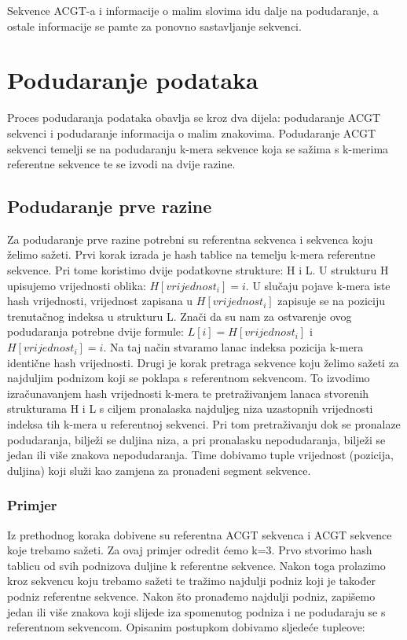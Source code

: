 Sekvence ACGT-a i informacije o malim slovima idu dalje na podudaranje, a ostale informacije se pamte za ponovno sastavljanje sekvenci.



 
\section{Podudaranje podataka}
Proces podudaranja podataka obavlja se kroz dva dijela: podudaranje ACGT sekvenci i podudaranje informacija o malim znakovima. Podudaranje ACGT sekvenci temelji se na podudaranju k-mera sekvence koja se sažima s k-merima referentne sekvence te se izvodi na dvije razine.

\subsection{Podudaranje prve razine}
Za podudaranje prve razine potrebni su referentna sekvenca i sekvenca koju želimo sažeti. 
Prvi korak izrada je hash tablice na temelju k-mera referentne sekvence. Pri tome koristimo dvije podatkovne strukture: H i L. U strukturu H upisujemo vrijednosti oblika: $H[vrijednost_{i}] = i$. U slučaju pojave k-mera iste hash vrijednosti, vrijednost zapisana u $H[vrijednost_{i}]$ zapisuje se na poziciju trenutačnog indeksa u strukturu L. Znači da su nam za ostvarenje ovog podudaranja potrebne dvije formule: $L[i] = H[vrijednost_{i}]$ i $H[vrijednost_{i}] = i$. Na taj način stvaramo lanac indeksa pozicija k-mera identične hash vrijednosti.
Drugi je korak pretraga sekvence koju želimo sažeti za najduljim podnizom koji se poklapa s referentnom sekvencom. To izvodimo izračunavanjem hash vrijednosti k-mera te pretraživanjem lanaca stvorenih strukturama H i L s ciljem pronalaska najduljeg niza uzastopnih vrijednosti indeksa tih k-mera u referentnoj sekvenci. Pri tom pretraživanju dok se pronalaze podudaranja, bilježi se duljina niza, a pri pronalasku nepodudaranja, bilježi se jedan ili više znakova nepodudaranja. Time dobivamo tuple vrijednost (pozicija, duljina) koji služi kao zamjena za pronađeni segment sekvence. 

\subsubsection{Primjer}
Iz prethodnog koraka dobivene su referentna ACGT sekvenca i ACGT sekvence koje trebamo sažeti. Za ovaj primjer odredit ćemo k=3. Prvo stvorimo hash tablicu od svih podnizova duljine k referentne sekvence. Nakon toga prolazimo kroz sekvencu koju trebamo sažeti te tražimo najdulji podniz koji je također podniz referentne sekvence. Nakon što pronađemo najdulji podniz, zapišemo jedan ili više znakova koji slijede iza spomenutog podniza i ne podudaraju se s referentnom sekvencom. Opisanim postupkom dobivamo sljedeće tupleove:\newline

